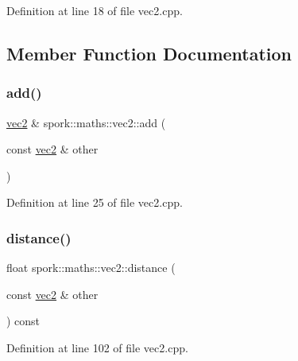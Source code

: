 Definition at line 18 of file vec2.\+cpp.



\subsection{Member Function Documentation}
\mbox{\label{structspork_1_1maths_1_1vec2_a22e7e6448259f6c6e94e3d1412b31746}} 
\subsubsection{\texorpdfstring{add()}{add()}}
{\footnotesize\ttfamily \hyperlink{structspork_1_1maths_1_1vec2}{vec2} \& spork\+::maths\+::vec2\+::add (\begin{DoxyParamCaption}\item[{const \hyperlink{structspork_1_1maths_1_1vec2}{vec2} \&}]{other }\end{DoxyParamCaption})}



Definition at line 25 of file vec2.\+cpp.

\mbox{\label{structspork_1_1maths_1_1vec2_ad58e41561822afb1864c07a3671e89cf}} 
\subsubsection{\texorpdfstring{distance()}{distance()}}
{\footnotesize\ttfamily float spork\+::maths\+::vec2\+::distance (\begin{DoxyParamCaption}\item[{const \hyperlink{structspork_1_1maths_1_1vec2}{vec2} \&}]{other }\end{DoxyParamCaption}) const}



Definition at line 102 of file vec2.\+cpp.

\mbox{\label{structspork_1_1maths_1_1vec2_a231f74d0f552909877f68fe0874f8692}} 
